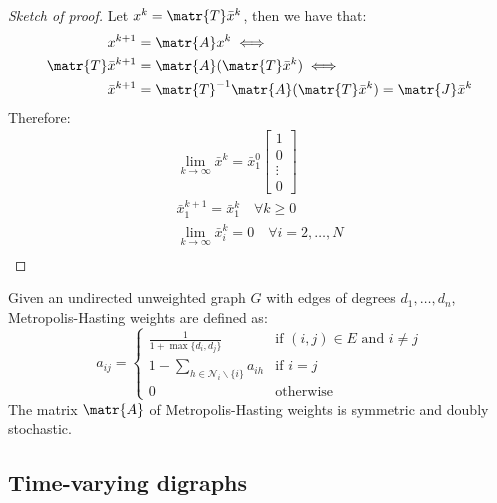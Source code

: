 \begin{theorem}[Consensus]
\begin{proof}[Sketch of proof]
        Let $x^k = \matr{T}\bar{x}^k$, then we have that:
        \[
            \begin{split}
                x^{k+1} &= \matr{A} x^{k} \iff \\
                \matr{T} \bar{x}^{k+1} &= \matr{A} (\matr{T} \bar{x}^k) \iff \\
                \bar{x}^{k+1} &= \matr{T}^{-1} \matr{A} (\matr{T} \bar{x}^k) = \matr{J}\bar{x}^k 
            \end{split}
        \]
        Therefore:
        \[
            \begin{gathered}
                \lim_{k \rightarrow \infty} \bar{x}^k = \bar{x}_1^0 \begin{bmatrix} 1 \\ 0 \\ \vdots \\ 0 \end{bmatrix} \\
                \bar{x}_1^{k+1} = \bar{x}_1^k \quad \forall k \geq 0 \\
                \lim_{k \rightarrow \infty} \bar{x}_i^{k} = 0 \quad \forall i = 2, \dots, N \\
            \end{gathered}
        \]
    \end{proof}
\end{theorem}

\begin{example}
    Given an undirected unweighted graph $G$ with edges of degrees $d_1, \dots, d_n$, Metropolis-Hasting weights are defined as:
    \[
        a_{ij} = \begin{cases}
            \frac{1}{1+\max\{ d_i, d_j \}} & \text{if $(i, j) \in E$ and $i \neq j$} \\
            1 - \sum_{h \in \mathcal{N}_i \smallsetminus \{i\}} a_{ih} & \text{if $i=j$} \\
            0 & \text{otherwise}
        \end{cases}
    \]
    The matrix $\matr{A}$ of Metropolis-Hasting weights is symmetric and doubly stochastic.
\end{example}


\subsection{Time-varying digraphs}

